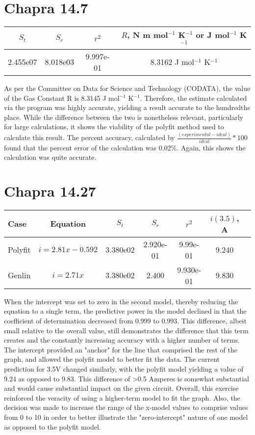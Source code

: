 \documentclass{article}
\begin{document}
\section{Chapra 14.7}
\begin{center}
\begin{tabular}{c|c|c|c}
$S_t$ & $S_r$ & $r^2$ & 
$R$, N m mol$^{-1}$ K$^{-1}$ or J  mol$^{-1}$ K$^{-1}$\\ \hline
2.455e07 & 8.018e03 &  9.997e-01 & 8.3162 J  mol$^{-1}$ K$^{-1}$
\end{tabular}
\end{center}
As per the Committee on Data for Science and Technology (CODATA), the value of the Gas Constant R is 8.3145  J  mol$^{-1}$ K$^{-1}$. Therefore, the estimate calculated via the program was highly accurate, yielding a result accurate to the hundredths place. While the difference between the two is nonetheless relevant, particularly for large calculations, it shows the viability of the polyfit method used to calculate this result. The percent accuracy, calculated by $\frac{(experimental-ideal)}{ideal} * 100$ found that the percent error of the calculation was 0.02\%. Again, this shows the calculation was quite accurate. 

\section{Chapra 14.27}
\begin{center}
\begin{tabular}{l|c|c|c|c|c|c}
Case & Equation & $S_t$ & $S_r$ & $r^2$ & $i(3.5)$, A\\ \hline
Polyfit & $i=2.81x-0.592$ & 3.380e02 & 2.920e-01 & 9.99e-01 &  9.240 \\ 
Genlin & $i=2.71x$ & 3.380e02 & 2.400 & 9.930e-01 & 9.830
\end{tabular}
\end{center}
When the intercept was set to zero in the second model, thereby reducing the equation to a single term, the predictive power in the model declined in that the coefficient of determination decreased from 0.999 to 0.993. This difference, albeit small relative to the overall value, still demonstrates the difference that this term creates and the constantly increasing accuracy with a higher number of terms. The intercept provided an "anchor" for the line that comprised the rest of the graph, and allowed the polyfit model to better fit the data. The current prediction for 3.5V changed similarly, with the polyfit model yielding a value of 9.24 as opposed to 9.83. This difference of >0.5 Amperes is somewhat substantial and would cause substantial impact on the given circuit. Overall, this exercise reinforced the veracity of using a higher-term model to fit the graph. Also, the decision was made to increase the range of the x-model values to comprise values from 0 to 10 in order to better illustrate the "zero-intercept" nature of one model as opposed to the polyfit model.
\end{document}
